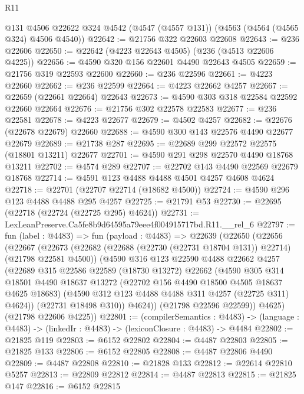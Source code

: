 \begin{lexlean}{R11}
\begin{coremodule}
    @131
    @4506
    @22622
    @324
    @4542
    (@4547 (@4557 @131))
    (@4563 (@4564 (@4565 @324) @4506 @4540))
@22642 := @21756 @322 @22603 @22608
@22643 := @236 @22606
@22650 := @22642 (@4223 @22643 @4505) (@236 (@4513 @22606 @4225))
@22656 := @4590 @320 @156 @22601 @4490 @22643 @4505
@22659 := @21756 @319 @22593 @22600
@22660 := @236 @22596
@22661 := @4223 @22660
@22662 := @236 @22599
@22664 := @4223 @22662 @4257
@22667 := @22659 (@22661 @22664) @22643
@22673 := @4590 @303 @318 @22584 @22592 @22660 @22664
@22676 := @21756 @302 @22578 @22583
@22677 := @236 @22581
@22678 := @4223 @22677
@22679 := @4502 @4257
@22682 := @22676 (@22678 @22679) @22660
@22688 := @4590 @300 @143 @22576 @4490 @22677 @22679
@22689 := @21738 @287
@22695 := @22689 @299 @22572 @22575 (@18801 @13211) @22677
@22701 := @4590 @291 @298 @22570 @4490 @18768 @13211
@22702 := @4574 @289
@22707 := @22702 @143 @4490 @22569 @22679 @18768
@22714 := @4591 @123 @4488 @4488 @4501 @4257 @4608 @4624
@22718 := @22701 (@22707 @22714 (@18682 @4500))
@22724 := @4590 @296 @123 @4488 @4488 @295 @4257
@22725 := @21791 @53
@22730 := @22695 (@22718 (@22724 (@22725 @295) @4624))
@22731 := LexLeanPreserve.Ca5fe8b9d64595a79eee4f004915717bd.R11.__rel_6
@22797 := fun (label : @4483) =>
  fun (payload : @4483) =>
  @22639
    (@22650
      (@22656
        (@22667
          (@22673
            (@22682 (@22688 (@22730 (@22731 @18704 @131)) @22714) (@21798 @22581 @4500))
            (@4590
              @316
              @123
              @22590
              @4488
              @22662
              @4257
              (@22689
                @315
                @22586
                @22589
                (@18730 @13272)
                @22662
                (@4590
                  @305
                  @314
                  @18501
                  @4490
                  @18637
                  @13272
                  (@22702 @156 @4490 @18500 @4505 @18637 @4625 @18683)
                  (@4590 @312 @123 @4488 @4488 @311 @4257 (@22725 @311) @4624))
                (@22731 @18498 @310))
              @4624))
          (@21798 @22596 @22599))
        @4625)
      (@21798 @22606 @4225))
@22801 := (compilerSemantics : @4483) ->
  (language : @4483) -> (linkedIr : @4483) -> (lexiconClosure : @4483) -> @4484
@22802 := @21825 @119
@22803 := @6152 @22802
@22804 := @4487 @22803
@22805 := @21825 @133
@22806 := @6152 @22805
@22808 := @4487 @22806 @4490
@22809 := @4487 @22808
@22810 := @21828 @133
@22812 := @22614 @22810 @5257
@22813 := @22809 @22812
@22814 := @4487 @22813
@22815 := @21825 @147
@22816 := @6152 @22815

\end{coremodule}
\end{lexlean}

